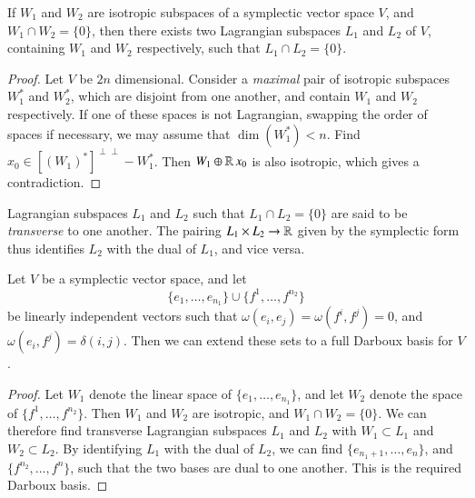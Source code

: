 \begin{lemma}
    If $W_1$ and $W_2$ are isotropic subspaces of a symplectic vector space $V$, and $W_1 \cap W_2 = \{ 0 \}$, then there exists two Lagrangian subspaces $L_1$ and $L_2$ of $V$, containing $W_1$ and $W_2$ respectively, such that $L_1 \cap L_2 = \{ 0 \}$.
\end{lemma}
\begin{proof}
    Let $V$ be $2n$ dimensional. Consider a \emph{maximal} pair of isotropic subspaces $W_1^*$ and $W_2^*$, which are disjoint from one another, and contain $W_1$ and $W_2$ respectively. If one of these spaces is not Lagrangian, swapping the order of spaces if necessary, we may assume that $\dim(W_1^*) < n$. Find $x_0 \in [(W_1)^*]^{\perp \perp} - W_1^*$. Then $W_1 \oplus \operatorname{\mathbb{R}} x_0$ is also isotropic, which gives a contradiction.
\end{proof}

Lagrangian subspaces $L_1$ and $L_2$ such that $L_1 \cap L_2 = \{ 0 \}$ are said to be \emph{transverse} to one another. The pairing $L_1 \times L_2 \to \operatorname{\mathbb{R}}$ given by the symplectic form thus identifies $L_2$ with the dual of $L_1$, and vice versa.

\begin{lemma}
    Let $V$ be a symplectic vector space, and let
    \[ \{ e_1, \dots, e_{n_1} \} \cup \{ f^1, \dots, f^{n_2} \} \]
    be linearly independent vectors such that $\omega(e_i,e_j) = \omega(f^i,f^j) = 0$, and $\omega(e_i,f^j) = \delta(i,j)$. Then we can extend these sets to a full Darboux basis for $V$.
\end{lemma}
\begin{proof}
    Let $W_1$ denote the linear space of $\{ e_1, \dots, e_{n_1} \}$, and let $W_2$ denote the space of $\{ f^1, \dots, f^{n_2} \}$. Then $W_1$ and $W_2$ are isotropic, and $W_1 \cap W_2 = \{ 0 \}$. We can therefore find transverse Lagrangian subspaces $L_1$ and $L_2$ with $W_1 \subset L_1$ and $W_2 \subset L_2$. By identifying $L_1$ with the dual of $L_2$, we can find $\{ e_{n_1 + 1}, \dots, e_n \}$, and $\{ f^{n_2}, \dots, f^n \}$, such that the two bases are dual to one another. This is the required Darboux basis.
\end{proof}

